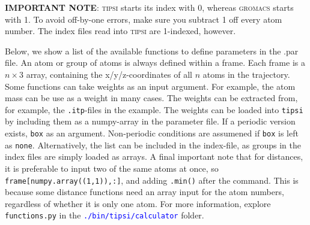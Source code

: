 \documentclass[]{article}
\begin{document}
\textbf{IMPORTANT NOTE}: \textsc{tipsi} starts its index with 0, whereas \textsc{gromacs} starts with 1. To avoid off-by-one errors, make sure you subtract 1 off every atom number. The index files read into \textsc{tipsi} are 1-indexed, however.

Below, we show a list of the available functions to define parameters in the .par file. An atom or group of atoms is always defined within a frame. 
Each frame is a $n \times 3$ array, containing the x/y/z-coordinates of all $n$ atoms in the trajectory. 
Some functions can take weights as an input argument. For example, the atom mass can be use as a weight in many cases.
The weights can be extracted from, for example, the \texttt{.itp}-files in the example.
The weights can be loaded into \texttt{tipsi} by including them as a numpy-array in the parameter file. 
If a periodic version exists, \texttt{box} as an argument. Non-periodic conditions are assumened if \texttt{box} is left as \texttt{none}.
Alternatively, the list can be included in the index-file, as groups in the index files are simply loaded as arrays.
A final important note that for distances, it is preferable to input two of the same atoms at once, so \texttt{frame[numpy.array((1,1)),:]}, and adding \texttt{.min()} after the command.
This is because some distance functions need an array input for the atom numbers, regardless of whether it is only one atom.
For more information, explore \texttt{functions.py} in the \textcolor{blue}{\texttt{./bin/tipsi/calculator}} folder.
\end{document}
